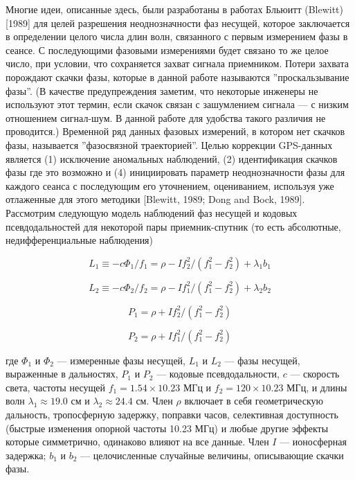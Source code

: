 \documentclass[12pt,a4paper]{article}
\begin{document}
Многие идеи, описанные здесь, были разработаны в работах Бльюитт (Blewitt)
[1989] для целей разрешения неоднозначности фаз несущей, которое заключается
в определении целого числа длин волн, связанного с первым измерением фазы в
сеансе. С последующими фазовыми измерениями будет связано то же целое число,
при условии, что сохраняется захват сигнала приемником. Потери захвата порождают
скачки фазы, которые в данной работе называются ''проскальзывание фазы''.
(В качестве предупреждения заметим, что некоторые инженеры не используют этот
термин, если скачок связан с зашумлением сигнала --- с низким отношением
сигнал-шум. В данной работе для удобства такого различия не проводится.)
Временной ряд данных фазовых измерений, в котором нет скачков фазы, называется
''фазосвязной траекторией''. Целью коррекции GPS-данных является (1) исключение
аномальных наблюдений, (2) идентификация скачков фазы где это возможно и (4)
инициировать параметр неоднозначности фазы для каждого сеанса с последующим его
уточнением, оцениванием, используя уже отлаженные для этого методики [Blewitt,
1989; Dong and Bock, 1989]. Рассмотрим следующую модель наблюдений фаз несущей
и кодовых псевдодальностей для некоторой пары приемник-спутник (то есть
абсолютные, недифференциальные наблюдения)

\begin{equation}
	L_1 \equiv -c \Phi_1 / f_1 = \rho - I f_2^2 / (f_1^2 - f_2^2) + \lambda_1
	b_1
\end{equation}

\begin{equation}
	L_2 \equiv -c \Phi_2 / f_2 = \rho - I f_1^2 / (f_1^2 - f_2^2) + \lambda_2
	b_2
\end{equation}

\begin{equation}
	P_1 = \rho + I f_2^2 / (f_1^2 - f_2^2)
\end{equation}

\begin{equation}
	P_2 = \rho + I f_1^2 / (f_1^2 - f_2^2)
\end{equation}

где $\Phi_1$ и $\Phi_2$ --- измеренные фазы несущей, $L_1$ и $L_2$ --- фазы
несущей, выраженные в дальностях, $P_1$ и $P_2$ --- кодовые псевдодальности,
$c$ --- скорость света, частоты несущей $f_1 = 1.54 \times 10.23$ МГц и
$f_2 = 120 \times 10.23$ МГц, и длины волн $\lambda_1 \approx 19.0$ см и
$\lambda_2 \approx 24.4$ см. Член $\rho$ включает в себя геометрическую
дальность, тропосферную задержку, поправки часов, селективная доступность
(быстрые изменения опорной частоты 10.23 МГц) и любые другие эффекты которые
симметрично, одинаково влияют на все данные. Член $I$ --- ионосферная задержка;
$b_1$ и $b_2$ --- целочисленные случайные величины, описывающие скачки фазы.
\end{document}
